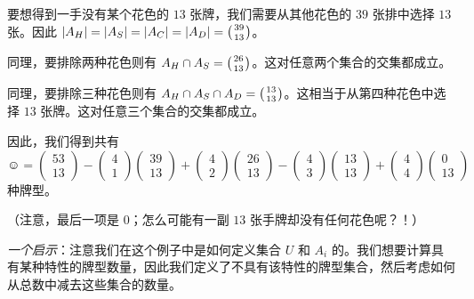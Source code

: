 \begin{example}[桥牌]
    要想得到一手没有某个花色的 $13$ 张牌，我们需要从其他花色的 $39$ 张排中选择 $13$ 张。因此 $|A_H| = |A_S| = |A_C| = |A_D| = \big({39 \atop 13}\big)$。

    同理，要排除两种花色则有 $A_H \cap A_S = \big({26 \atop 13}\big)$。这对任意两个集合的交集都成立。

    同理，要排除三种花色则有 $A_H \cap A_S \cap A_D = \big({13 \atop 13}\big)$。这相当于从第四种花色中选择 $13$ 张牌。这对任意三个集合的交集都成立。

    因此，我们得到共有
    \[\smiley{} = \begin{pmatrix}53\\13\end{pmatrix}-\begin{pmatrix}4\\1\end{pmatrix}\begin{pmatrix}39\\13\end{pmatrix}+\begin{pmatrix}4\\2\end{pmatrix}\begin{pmatrix}26\\13\end{pmatrix}-\begin{pmatrix}4\\3\end{pmatrix}\begin{pmatrix}13\\13\end{pmatrix}+\begin{pmatrix}4\\4\end{pmatrix}\begin{pmatrix}0\\13\end{pmatrix}\]
    种牌型。

    （注意，最后一项是 $0$；怎么可能有一副 $13$ 张手牌却没有任何花色呢？！）

    \emph{一个启示}：注意我们在这个例子中是如何定义集合 $U$ 和 $A_i$ 的。我们想要计算具有某种特性的牌型数量，因此我们定义了不具有该特性的牌型集合，然后考虑如何从总数中减去这些集合的数量。
\end{example}

